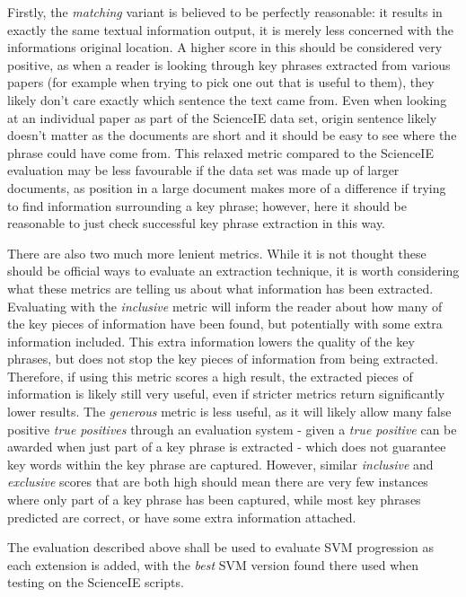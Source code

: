 Firstly, the \textit{matching} variant is believed to be perfectly reasonable: it results in exactly the same textual information output, it is merely less concerned with the informations original location. A higher score in this should be considered very positive, as when a reader is looking through key phrases extracted from various papers (for example when trying to pick one out that is useful to them), they likely don't care exactly which sentence the text came from. Even when looking at an individual paper as part of the ScienceIE data set, origin sentence likely doesn't matter as the documents are short and it should be easy to see where the phrase could have come from. This relaxed metric compared to the ScienceIE evaluation may be less favourable if the data set was made up of larger documents, as position in a large document makes more of a difference if trying to find information surrounding a key phrase; however, here it should be reasonable to just check successful key phrase extraction in this way.

There are also two much more lenient metrics. While it is not thought these should be official ways to evaluate an extraction technique, it is worth considering what these metrics are telling us about what information has been extracted. Evaluating with the \textit{inclusive} metric will inform the reader about how many of the key pieces of information have been found, but potentially with some extra information included. This extra information lowers the quality of the key phrases, but does not stop the key pieces of information from being extracted. Therefore, if using this metric scores a high result, the extracted pieces of information is likely still very useful, even if stricter metrics return significantly lower results. The \textit{generous} metric is less useful, as it will likely allow many false positive \textit{true positives} through an evaluation system - given a \textit{true positive} can be awarded when just part of a key phrase is extracted - which does not guarantee key words within the key phrase are captured. However, similar \textit{inclusive} and \textit{exclusive} scores that are both high should mean there are very few instances where only part of a key phrase has been captured, while most key phrases predicted are correct, or have some extra information attached.

The evaluation described above shall be used to evaluate SVM progression as each extension is added, with the \textit{best} SVM version found there used when testing on the ScienceIE scripts.

